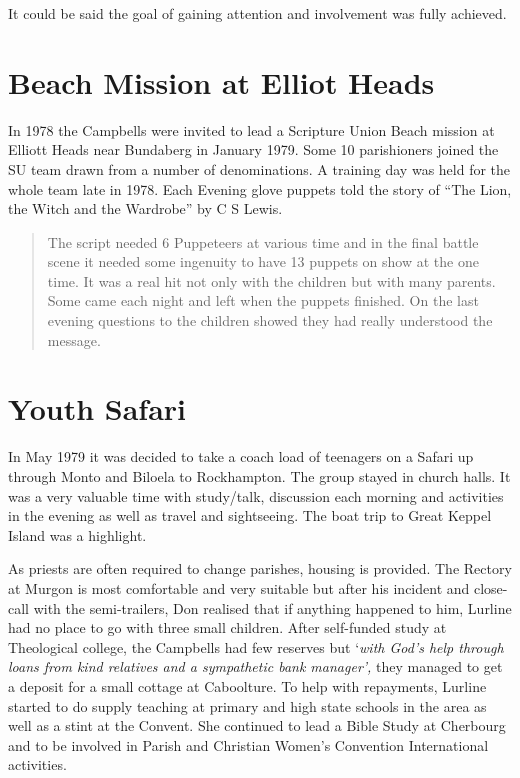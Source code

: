 It could be said the goal of gaining attention and involvement was fully
achieved.

\hypertarget{beach-mission-at-elliot-heads}{%
\section{Beach Mission at Elliot
Heads}\label{beach-mission-at-elliot-heads}}

In 1978 the Campbells were invited to lead a Scripture Union Beach
mission at Elliott Heads near Bundaberg in January 1979. Some 10
parishioners joined the SU team drawn from a number of denominations. A
training day was held for the whole team late in 1978. Each Evening
glove puppets told the story of ``The Lion, the Witch and the Wardrobe''
by C S Lewis.

\begin{quote}
The script needed 6 Puppeteers at various time and in the final battle
scene it needed some ingenuity to have 13 puppets on show at the one
time. It was a real hit not only with the children but with many
parents. Some came each night and left when the puppets finished. On the
last evening questions to the children showed they had really understood
the message.
\end{quote}

\hypertarget{youth-safari}{%
\section{Youth Safari}\label{youth-safari}}

In May 1979 it was decided to take a coach load of teenagers on a Safari
up through Monto and Biloela to Rockhampton. The group stayed in church
halls. It was a very valuable time with study/talk, discussion each
morning and activities in the evening as well as travel and sightseeing.
The boat trip to Great Keppel Island was a highlight.

As priests are often required to change parishes, housing is provided.
The Rectory at Murgon is most comfortable and very suitable but after
his incident and close-call with the semi-trailers, Don realised that if
anything happened to him, Lurline had no place to go with three small
children. After self-funded study at Theological college, the Campbells
had few reserves but `\emph{with God's help through loans from kind
relatives and a sympathetic bank manager',} they managed to get a
deposit for a small cottage at Caboolture. To help with repayments,
Lurline started to do supply teaching at primary and high state schools
in the area as well as a stint at the Convent. She continued to lead a
Bible Study at Cherbourg and to be involved in Parish and Christian
Women's Convention International activities.

